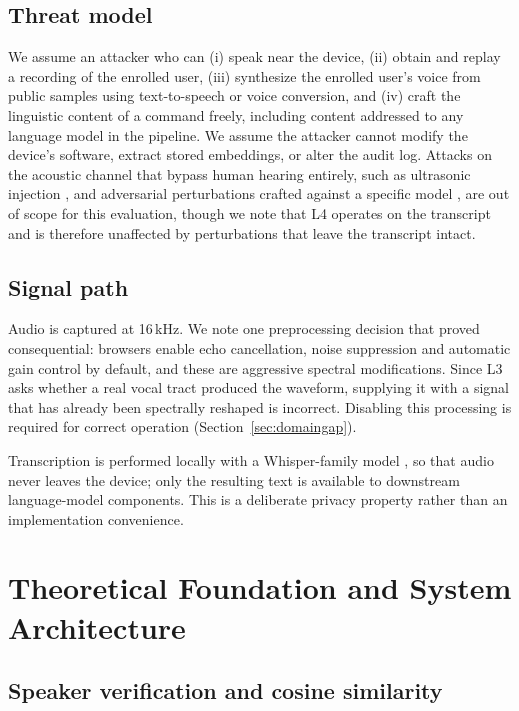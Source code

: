 \documentclass[conference]{IEEEtran}
\begin{document}
\subsection{Threat model}

We assume an attacker who can (i) speak near the device, (ii) obtain and replay
a recording of the enrolled user, (iii) synthesize the enrolled user's voice
from public samples using text-to-speech or voice conversion, and (iv) craft
the linguistic content of a command freely, including content addressed to any
language model in the pipeline. We assume the attacker cannot modify the
device's software, extract stored embeddings, or alter the audit log. Attacks
on the acoustic channel that bypass human hearing entirely, such as ultrasonic
injection \cite{zhang2017dolphin}, and adversarial perturbations crafted
against a specific model \cite{carlini2018audio,chen2021bob}, are
out of scope for this evaluation, though we note that L4 operates on the
transcript and is therefore unaffected by perturbations that leave the
transcript intact.

\subsection{Signal path}

Audio is captured at 16\,kHz. We note one preprocessing decision that proved
consequential: browsers enable echo cancellation, noise suppression and
automatic gain control by default, and these are aggressive spectral
modifications. Since L3 asks whether a real vocal tract produced the waveform,
supplying it with a signal that has already been spectrally reshaped is
incorrect. Disabling this processing is required for correct operation
(Section~\ref{sec:domaingap}).

Transcription is performed locally with a Whisper-family model
\cite{radford2023whisper}, so that audio never leaves the device; only the
resulting text is available to downstream language-model components. This is a
deliberate privacy property rather than an implementation convenience.

\section{Theoretical Foundation and System Architecture}

\subsection{Speaker verification and cosine similarity}
\end{document}

